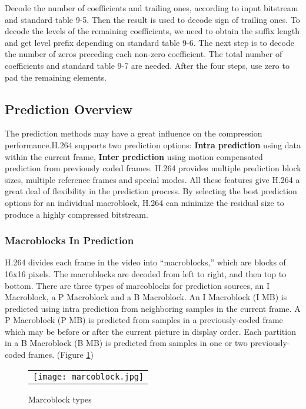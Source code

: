 \documentclass[../main.tex]{subfiles}
\begin{document}
Decode the number of coefficients and trailing ones, according to input bitstream and standard table 9-5. Then the result is used to decode sign of trailing ones. To decode the levels of the remaining coefficients, we need to obtain the suffix length and get level prefix depending on standard table 9-6. The next step is to decode the number of zeros preceding each non-zero coefficient. The total number of coefficients and standard table 9-7 are needed. After the four steps, use zero to pad the remaining elements.

\subsection{Prediction Overview}

The prediction methods may have a great influence on the compression performance.H.264 supports two prediction options: \textbf{Intra prediction} using data within
the current frame, \textbf{Inter prediction} using motion compensated prediction from previously
coded frames. H.264 provides multiple prediction block sizes, multiple reference frames and special modes. All these features give H.264 a great deal of flexibility in the prediction process. By selecting the best prediction options for an individual macroblock, H.264 can minimize the residual size to produce a highly compressed bitstream.



\subsubsection{ Macroblocks In Prediction }

H.264 divides each frame in the video into “macroblocks,” which are blocks of 16x16
pixels. The macroblocks are decoded from left to right, and then top to bottom. There are three types of marcoblocks for prediction sources, an I Macroblock, a P Macroblock and a B Macroblock. An I Macroblock (I MB) is predicted using intra prediction from
neighboring samples in the current frame. A P Macroblock (P MB) is predicted from samples
in a previously-coded frame which may be before or after the current picture in display order.  Each partition in a B Macroblock (B MB) is
predicted from samples in one or two previously-coded frames. (Figure \ref{fig:mbtypes})

  \begin{figure} [ht]
   \begin{center}
   \begin{tabular}{c} %
   \texttt{[image: marcoblock.jpg]}
   \end{tabular}
   \end{center}
   \caption[mbtypes] 
   { \label{fig:mbtypes} Marcoblock types \cite{richardson2004h} }
   \end{figure}     %
\end{document}
